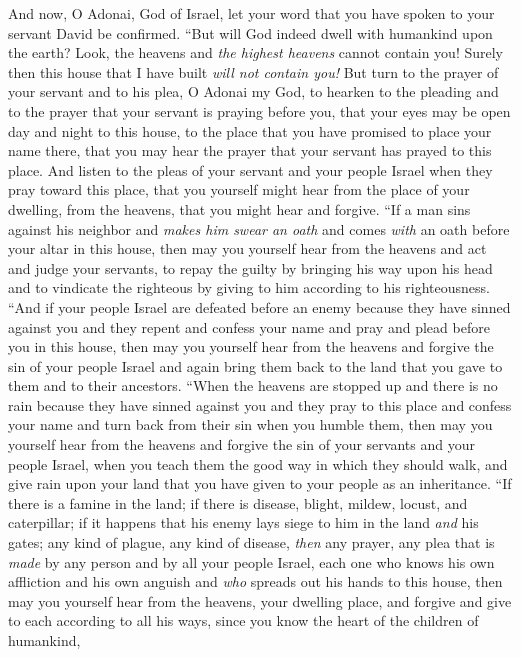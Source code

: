 \begin{biblechapter}
\verse And now, O Adonai, God of Israel, let your word that you have spoken to your servant David be confirmed.
\verse “But will God indeed dwell with humankind upon the earth? Look, the heavens and \textit{the highest heavens} cannot contain you! Surely then this house that I have built \textit{will not contain you!}
\verse But turn to the prayer of your servant and to his plea, O Adonai my God, to hearken to the pleading and to the prayer that your servant is praying before you,
\verse that your eyes may be open day and night to this house, to the place that you have promised to place your name there, that you may hear the prayer that your servant has prayed to this place.
\verse And listen to the pleas of your servant and your people Israel when they pray toward this place, that you yourself might hear from the place of your dwelling, from the heavens, that you might hear and forgive.
\verse “If a man sins against his neighbor and \textit{makes him swear an oath} and comes \textit{with} an oath before your altar in this house,
\verse then may you yourself hear from the heavens and act and judge your servants, to repay the guilty by bringing his way upon his head and to vindicate the righteous by giving to him according to his righteousness.
\verse “And if your people Israel are defeated before an enemy because they have sinned against you and they repent and confess your name and pray and plead before you in this house,
\verse then may you yourself hear from the heavens and forgive the sin of your people Israel and again bring them back to the land that you gave to them and to their ancestors.
\verse “When the heavens are stopped up and there is no rain because they have sinned against you and they pray to this place and confess your name and turn back from their sin when you humble them,
\verse then may you yourself hear from the heavens and forgive the sin of your servants and your people Israel, when you teach them the good way in which they should walk, and give rain upon your land that you have given to your people as an inheritance.
\verse “If there is a famine in the land; if there is disease, blight, mildew, locust, and caterpillar; if it happens that his enemy lays siege to him in the land \textit{and} his gates; any kind of plague, any kind of disease,
\verse \textit{then} any prayer, any plea that is \textit{made} by any person and by all your people Israel, each one who knows his own affliction and his own anguish and \textit{who} spreads out his hands to this house,
\verse then may you yourself hear from the heavens, your dwelling place, and forgive and give to each according to all his ways, since you know the heart of the children of humankind,

\end{biblechapter}
